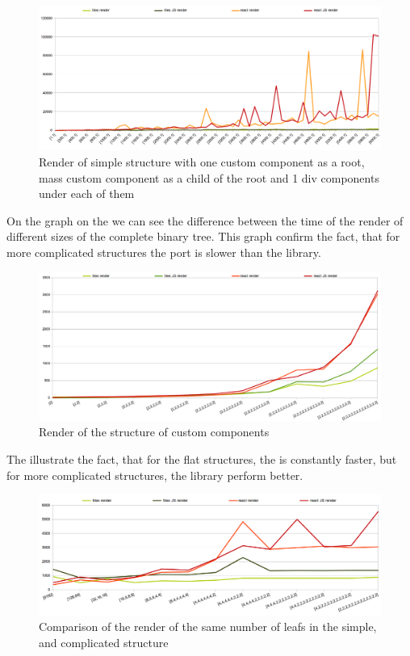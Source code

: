 	\begin{figure}[h]
	\centering  
		\includegraphics[scale=0.5]{images/benchmarks/m1_render.png}
		\caption{Render of simple structure with one custom component as a root, mass custom component as a child of the root and 1 div components under each of them}
		\label{img:benchmarks-mass-1-render}
	\end{figure}

	On the graph on the  we can see the difference between the time of the render of different sizes of the complete binary tree.
	This graph confirm the fact, that for more complicated structures the \react port is slower than the \tiles library.

	\begin{figure}[h]
	\centering  
		\includegraphics[scale=0.5]{images/benchmarks/s_render.png}
		\caption{Render of the structure of custom components}
		\label{img:benchmarks-structure-render}
	\end{figure}

	The  illustrate the fact, that for the flat structures, 
	the \react is constantly faster, but for more complicated structures, the \tiles library perform better.

	\begin{figure}[h]
	\centering  
		\includegraphics[scale=0.55]{images/benchmarks/mvs_render.png}
		\caption{Comparison of the render of the same number of leafs in the simple, and complicated structure}
		\label{img:benchmarks-mass-vs-structure-render}
	\end{figure}

